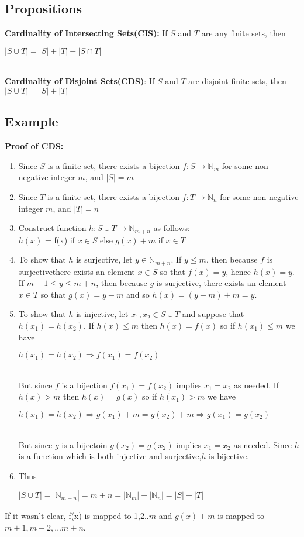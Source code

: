 \documentclass[12pt]{report}
\begin{document}
		\subsection{Propositions}
			\textbf{Cardinality of Intersecting Sets(CIS):} If $S$ and $T$ are any finite sets, then \\
			\centerline{$|S \cup T| = |S| + |T| - |S \cap T|$}\\
			\textbf{Cardinality of Disjoint Sets(CDS)}: If $S$ and $T$ are disjoint finite sets, then $|S \cup T| = |S| + |T|$\\
			
		\subsection{Example}
			\textbf{Proof of CDS:}
			\begin{enumerate}
				\item Since $S$ is a finite set, there exists a bijection $f:S \rightarrow \mathbb{N}_m$ for some non negative integer $m$, and $|S| = m$
				\item Since $T$ is a finite set, there exists a bijection $f:T \rightarrow \mathbb{N}_n$ for some non negative integer $m$, and $|T| = n$
				\item Construct function $h:S \cup T \rightarrow \mathbb{N}_{m+n}$ as follows: \\
				$h(x)$ = f(x) if $x \in S$ else $g(x) + m$ if $x \in T$
				\item To show that $h$ is surjective, let $y \in \mathbb{N}_{m+n}$. If $y \leq m$, then because $f$ is surjectivethere exists an element $x \in S$ so that $f(x) = y$, hence $h(x) = y$. If $m+1 \leq y \leq m + n$, then because $g$ is surjective, there exists an element $x \in T$ so that $g(x) = y-m$ and so $h(x) = (y-m) + m = y$.
				\item To show that $h$ is injective, let $x_1, x_2 \in S \cup T$ and suppose that $h(x_1) = h(x_2)$. If $h(x) \leq m$ then $h(x) = f(x)$ so if $h(x_1) \leq m$ we have\\
				\centerline{$h(x_1) = h(x_2) \Rightarrow f(x_1) = f(x_2)$} \\
				But since $f$ is a bijection $f(x_1) = f(x_2)$ implies $x_1 = x_2$ as needed. If $h(x) > m$ then $h(x) = g(x)$ so if $h(x_1) > m$ we have \\
				\centerline{$h(x_1) = h(x_2) \Rightarrow g(x_1) + m = g(x_2) + m \Rightarrow g(x_1) = g(x_2)$} \\
				But since $g$ is a bijectoin $g(x_2) = g(x_2) $ implies $x_1 = x_2$ as needed. Since $h$ is a function which is both injective and surjective,$h$ is bijective.
				\item Thus \\
				\centerline{$|S \cup T| = |\mathbb{N}_{m+n}| = m+n=|\mathbb{N}_m| + |\mathbb{N}_n| = |S| + |T|$}
			\end{enumerate}
			If it wasn't clear, f(x) is mapped to 1,2..$m$ and $g(x) + m$ is mapped to $m+1, m+2,$...$m+n$.
\end{document}
